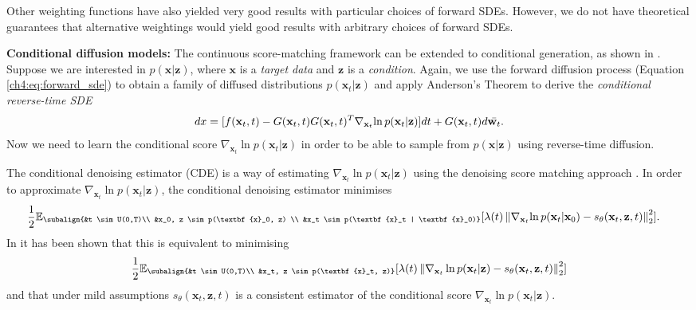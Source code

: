 Other weighting functions have also yielded very good results \cite{kingmaVDM} with particular choices of forward SDEs. However, we do not have theoretical guarantees that alternative weightings would yield good results with arbitrary choices of forward SDEs.


\textbf{Conditional diffusion models:} The continuous score-matching framework can be extended to conditional generation, as shown in  \cite{song2020score}. Suppose we are interested in $p(\textbf{x} | \textbf{z})$, where $\textbf{x}$ is a \textit{target data} and $\textbf{z}$ is a \textit{condition}. Again, we use the forward diffusion process (Equation \ref{ch4:eq:forward_sde}) to obtain a family of diffused distributions $p(\textbf{x}_t | \textbf{z})$ and apply Anderson's Theorem to derive the \textit{conditional reverse-time SDE}
\begin{equation}
\label{ch4:eq:conditional_reverse_sde}
    dx = [f(\textbf{x}_t,t) -G(\textbf{x}_t,t)G(\textbf{x}_t,t)^T\nabla_{\textbf{x}_t}{\ln{p(\textbf{x}_t | \textbf{z})}}]dt + G(\textbf{x}_t,t)d\Bar{\textbf{w}_t}.
\end{equation}
Now we need to learn the conditional score $\nabla_{\textbf{x}_t} \ln{p(\textbf{x}_t | \textbf{z})}$ in order to be able to sample from $p(\textbf{x} | \textbf{z})$ using reverse-time diffusion.

The conditional denoising estimator (CDE) is a way of estimating $\nabla_{\textbf{x}_t} \ln{p(\textbf{x}_t | \textbf{z})}$ using the denoising score matching approach \cite{vincent2011connection, song2020score}. In order to approximate $\nabla_{\textbf{x}_t} \ln{p(\textbf{x}_t | \textbf{z})}$, the conditional denoising estimator minimises
\begin{gather}
\begin{aligned}
        \label{ch4:CDE}
        &\frac{1}{2} \mathbb{E}_{\subalign{&t \sim U(0,T)\\ &x_0, z \sim p(\textbf{x}_0, z) \\ &x_t \sim p(\textbf{x}_t | \textbf{x}_0)}} 
        [\lambda(t) \norm{\nabla_{\textbf{x}_t}{\ln{p(\textbf{x}_t | \textbf{x}_0)}} -  s_\theta(\textbf{x}_t, \textbf{z},t)}_2^2].
\end{aligned}
\end{gather}
In \cite{batzolis2022non_uniform} it has been shown that this is equivalent to minimising 
\begin{gather*}
        \frac{1}{2} \mathbb{E}_{\subalign{&t \sim U(0,T)\\ &x_t, z \sim p(\textbf{x}_t, z)}} 
        [\lambda(t) \norm{\nabla_{\textbf{x}_t} \ln{p(\textbf{x}_t | \textbf{z})} - s_\theta(\textbf{x}_t, \textbf{z},t)}_2^2]
\end{gather*}
and that under mild assumptions $ s_\theta(\textbf{x}_t, \textbf{z},t)$ is a consistent estimator of the conditional score $\nabla_{\textbf{x}_t} \ln{p(\textbf{x}_t | \textbf{z})}$.


